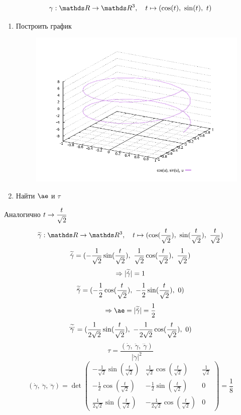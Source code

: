 \documentclass[12pt, fleqn]{article}
\begin{document}
\begin{Example}
  \[\gamma: \R \ra \R^3,\q t \mapsto (\cos(t),\ \sin(t),\ t)\]
  \begin{enumerate}
    \item Построить график
    \begin{figure}[H]
  	    \includegraphics[scale=0.6]{pics/2_3.png}
  	    \centering
  	\end{figure}
    \item Найти $\ae$ и $\tau$
  \end{enumerate}
\end{Example}

\begin{sol}
    Аналогично $t \rightarrow \dfrac{t}{\sqrt{2}}$
    \[\w{\gamma}: \R \ra \R^3,\q t \mapsto (\cos(\frac{t}{\sqrt{2}}),\ \sin(\frac{t}{\sqrt{2}}),\ \frac{t}{\sqrt{2}})\]
    \[\w{\dot{\gamma}}=(-\frac{1}{\sqrt{2}} \sin(\frac{t}{\sqrt{2}}),\ \frac{1}{\sqrt{2}} \cos(\frac{t}{\sqrt{2}}),\ \frac{1}{\sqrt{2}})\]
    \[\Rightarrow |\widetilde{\dot{\gamma}}|=1\]
    \[\w{\ddot{\gamma}}=(-\frac{1}{2} \cos(\frac{t}{\sqrt{2}}),\ -\frac{1}{2} \sin(\frac{t}{\sqrt{2}}),\ 0)\]
    \[\Ra \ae = |\w{\ddot{\gamma}}| = \frac{1}{2}\]
    \[\widetilde{\overset{{}_{\displaystyle ...}}{\gamma}}=(\frac{1}{2 \sqrt{2}} \sin(\frac{t}{\sqrt{2}}),\ -\frac{1}{2 \sqrt{2}} \cos(\frac{t}{\sqrt{2}}),\ 0)\]
    \[\tau = \frac{(\dot{\gamma},\ \ddot{\gamma},\ \dddot{\gamma})}{|\ddot{\gamma}|^2}\]
    \[(\dot{\gamma},\ \ddot{\gamma},\ \dddot{\gamma}) = \det
    \begin{pmatrix}
      -\frac{1}{\sqrt{2}} \sin(\frac{t}{\sqrt{2}}) & \frac{1}{\sqrt{2}} \cos(\frac{t}{\sqrt{2}}) & \frac{1}{\sqrt{2}}\\
      -\frac{1}{2} \cos(\frac{t}{\sqrt{2}}) & -\frac{1}{2} \sin(\frac{t}{\sqrt{2}}) & 0\\
      \frac{1}{2 \sqrt{2}} \sin(\frac{t}{\sqrt{2}}) & -\frac{1}{2 \sqrt{2}} \cos(\frac{t}{\sqrt{2}}) & 0
    \end{pmatrix} = \frac{1}{8}\]
\end{sol}
\end{document}
